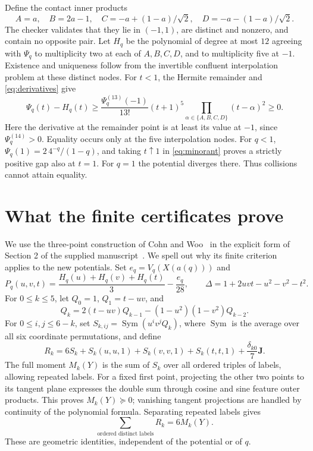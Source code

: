 \documentclass[11pt,reqno]{amsart}
\theoremstyle{remark}\newtheorem{remark}[theorem]{Remark}
\newcommand{\Sym}{\operatorname{Sym}}
\numberwithin{equation}{section}
\begin{document}
Define the contact inner products
\begin{equation}\label{eq:contacts}
 A=a,\quad B=2a-1,\quad C=-a+(1-a)/\sqrt2,\quad D=-a-(1-a)/\sqrt2.
\end{equation}
The checker validates that they lie in $(-1,1)$, are distinct and nonzero,
and contain no opposite pair. Let $H_q$ be the polynomial of degree at most
$12$ agreeing with $\Psi_q$ to multiplicity two at each of $A,B,C,D$, and
to multiplicity five at $-1$. Existence and uniqueness follow from the
invertible confluent interpolation problem at these distinct nodes.
For $t<1$, the Hermite remainder and \eqref{eq:derivatives} give
\begin{equation}\label{eq:minorant}
 \Psi_q(t)-H_q(t)\ge
 \frac{\Psi_q^{(13)}(-1)}{13!}(t+1)^5
       \prod_{\alpha\in\{A,B,C,D\}}(t-\alpha)^2\ge0.
\end{equation}
Here the derivative at the remainder point is at least its value at $-1$,
since $\Psi_q^{(14)}>0$. Equality occurs only at the five interpolation nodes.
For $q<1$, $\Psi_q(1)=2\,4^{-q}/(1-q)$, and taking $t\uparrow1$ in
\eqref{eq:minorant} proves a strictly positive gap also at $t=1$.
For $q=1$ the potential diverges there. Thus collisions cannot attain equality.

\section{What the finite certificates prove}
We use the three-point construction of Cohn and Woo~\cite{CW} in the explicit
form of Section 2 of the supplied manuscript~\cite{source}. We spell out why
its finite criterion applies to the new potentials. Set
$e_q=V_q(X(a(q)))$ and
\[
 P_q(u,v,t)=\frac{H_q(u)+H_q(v)+H_q(t)}3-\frac{e_q}{28},\qquad
 \Delta=1+2uvt-u^2-v^2-t^2.
\]
For $0\le k\le5$, let $Q_0=1$, $Q_1=t-uv$, and
\[
 Q_k=2(t-uv)Q_{k-1}-(1-u^2)(1-v^2)Q_{k-2}.
\]
For $0\le i,j\le6-k$, set $S_{k,ij}=\Sym(u^iv^jQ_k)$, where $\Sym$ is
the average over all six coordinate permutations, and define
\[
 R_k=6S_k+S_k(u,u,1)+S_k(v,v,1)+S_k(t,t,1)+\frac{\delta_{k0}}7\mathbf J.
\]
The full moment $M_k(Y)$ is the sum of $S_k$ over all ordered triples of
labels, allowing repeated labels. For a fixed first point, projecting the
other two points to its tangent plane expresses the double sum through
cosine and sine feature outer products. This proves $M_k(Y)\succeq0$;
vanishing tangent projections are handled by continuity of the polynomial
formula. Separating repeated labels gives
\begin{equation}\label{eq:count}
 \sum_{\text{ordered distinct labels}}R_k=6M_k(Y).
\end{equation}
These are geometric identities, independent of the potential or of $q$.
\end{document}
